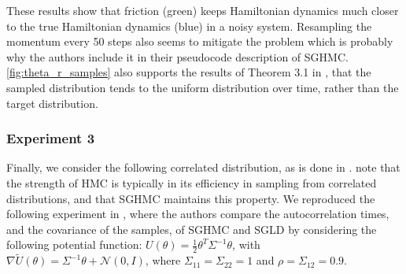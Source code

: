 These results show that friction (green) keeps Hamiltonian dynamics much closer to the true Hamiltonian dynamics (blue) in a noisy system. Resampling the momentum every 50 steps also seems to mitigate the problem which is probably why the authors \citeauthor{sghmc} include it in their pseudocode description of SGHMC. \cref{fig:theta_r_samples} also supports the results of Theorem 3.1 in \cite{sghmc}, that the sampled distribution tends to the uniform distribution over time, rather than the target distribution.
\subsubsection*{Experiment 3}
Finally, we consider the following correlated distribution, as is done in \cite{sghmc}. \citeauthor{sghmc} note that the strength of HMC is typically in its efficiency in sampling from correlated distributions, and that SGHMC maintains this property. We reproduced the following experiment in \cite{sghmc}, where the authors \citeauthor{sghmc} compare the autocorrelation times, and the covariance of the samples, of SGHMC and SGLD by considering the following potential function: $U(\theta)=\frac{1}{2}\theta^T\Sigma^{-1}\theta$, with $\nabla \widetilde{U}(\theta) = \Sigma^{-1}\theta + \mathcal{N}(0,I)$, where $\Sigma_{11} = \Sigma_{22} = 1$ and $\rho = \Sigma_{12} = 0.9$.  

